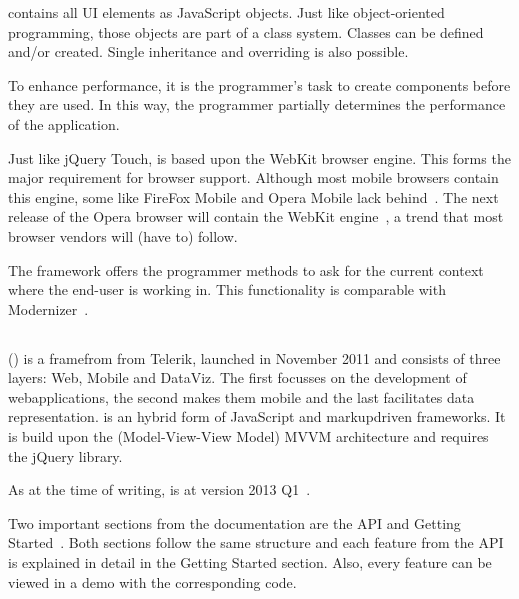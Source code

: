 \documentclass[a4paper]{artikel3}
\newcommand{\setspace}[0]{\vspace{2mm}}
\renewcommand{\paragraph}[1]{\setspace \noindent {\bf #1}  }
\begin{document}
\sta{} contains all UI elements as JavaScript objects.  
Just like object-oriented programming,  those objects are part of a class system.  
Classes can be defined and/or created.  
Single inheritance and overriding is also possible.    

To enhance performance,  it is the programmer's task to create components before they are used.  
In this way,  the programmer partially determines the performance of the application.

\paragraph{Browser support}
Just like jQuery Touch,  \sta{} is based upon the WebKit browser engine.  
This forms the major requirement for browser support.  
Although most mobile browsers contain this engine,  some like FireFox Mobile and Opera Mobile lack behind~\cite{JohnEClark2012}.  
The next release of the Opera browser will contain the WebKit engine~\cite{Wokke2013}, a trend that most browser vendors will (have to) follow.

The framework offers the programmer methods to ask for the current context where the end-user is working in.
This functionality is comparable with Modernizer~\cite{Modernizr2012}.  


\subsection{\kendo} %
\label{sec:frameworks-kendo}

\kendo{} (\kendob{}) is a framefrom from Telerik,  launched in November 2011 and consists of three layers:  Web,  Mobile and DataViz.
The first focusses on the development of webapplications,  the second makes them mobile and the last facilitates data representation.
\kendob{} is an hybrid form of JavaScript and markupdriven frameworks.
It is build upon the (Model-View-View Model) MVVM architecture and requires the jQuery library.

As at the time of writing,  \kendob{} is at version 2013 Q1~\cite{Telerik}. 

\paragraph{Documentation}
Two important sections from the documentation are the API and Getting Started~\cite{Telerikd}.
Both sections follow the same structure and each feature from the API is explained in detail in the Getting Started section.
Also,  every feature can be viewed in a demo with the corresponding code.
\end{document}
